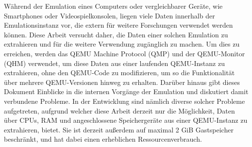 
\Abstract
Während der Emulation eines Computers oder vergleichbarer Geräte, wie Smartphones oder Videospielkonsolen,
liegen viele Daten innerhalb der Emulationsinstanz vor, die extern für weitere Forschungen verwendet werden können.
Diese Arbeit versucht daher, die Daten einer solchen Emulation zu extrahieren und für die weitere Verwendung zugänglich zu machen.
Um dies zu erreichen, werden das QEMU Machine Protocol (QMP) und der QEMU-Monitor (QHM) verwendet, um diese Daten aus einer laufenden QEMU-Instanz zu extrahieren,
ohne den QEMU-Code zu modifizieren, um so die Funktionalität über mehrere QEMU-Versionen hinweg zu erhalten.
Darüber hinaus gibt dieses Dokument Einblicke in die internen Vorgänge der Emulation und diskutiert damit verbundene Probleme.
In der Entwicklung sind nämlich diverse solcher Probleme aufgetreten,
aufgrund welcher diese Arbeit derzeit nur die Möglichkeit, Daten über CPUs, RAM und angeschlossene Speichergeräte aus einer QEMU-Instanz zu extrahieren, bietet.
Sie ist derzeit außerdem auf maximal 2 GiB Gastspeicher beschränkt, und hat dabei einen erheblichen Ressourcenverbrauch.